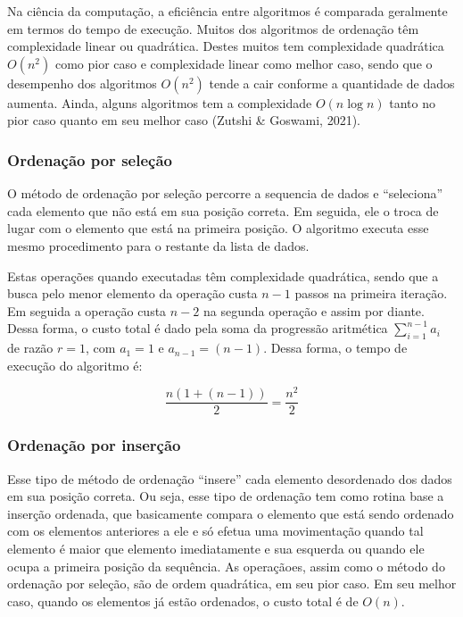 \documentclass[
]{article}
\begin{document}
Na ciência da computação, a eficiência entre algoritmos é comparada
geralmente em termos do tempo de execução. Muitos dos algoritmos de
ordenação têm complexidade linear ou quadrática. Destes muitos tem
complexidade quadrática \(O(n^2)\) como pior caso e complexidade linear
como melhor caso, sendo que o desempenho dos algoritmos \(O(n^2)\) tende
a cair conforme a quantidade de dados aumenta. Ainda, alguns algoritmos
tem a complexidade \(O(n \log n)\) tanto no pior caso quanto em seu
melhor caso (Zutshi \& Goswami, 2021).

\hypertarget{ordenauxe7uxe3o-por-seleuxe7uxe3o}{%
\subsubsection{Ordenação por
seleção}\label{ordenauxe7uxe3o-por-seleuxe7uxe3o}}

O método de ordenação por seleção percorre a sequencia de dados e
``seleciona'' cada elemento que não está em sua posição correta. Em
seguida, ele o troca de lugar com o elemento que está na primeira
posição. O algoritmo executa esse mesmo procedimento para o restante da
lista de dados.

Estas operações quando executadas têm complexidade quadrática, sendo que
a busca pelo menor elemento da operação custa \(n - 1\) passos na
primeira iteração. Em seguida a operação custa \(n - 2\) na segunda
operação e assim por diante. Dessa forma, o custo total é dado pela soma
da progressão aritmética \(\sum\limits_{i = 1}^{n-1} a_i\) de razão
\(r = 1\), com \(a_1 = 1\) e \(a_{n-1} = (n-1)\). Dessa forma, o tempo
de execução do algoritmo é:

\begin{equation}
  \frac{n(1+(n-1))}{2} = \frac{n^2}{2}
\end{equation}

\hypertarget{ordenauxe7uxe3o-por-inseruxe7uxe3o}{%
\subsubsection{Ordenação por
inserção}\label{ordenauxe7uxe3o-por-inseruxe7uxe3o}}

Esse tipo de método de ordenação ``insere'' cada elemento desordenado
dos dados em sua posição correta. Ou seja, esse tipo de ordenação tem
como rotina base a inserção ordenada, que basicamente compara o elemento
que está sendo ordenado com os elementos anteriores a ele e só efetua
uma movimentação quando tal elemento é maior que elemento imediatamente
e sua esquerda ou quando ele ocupa a primeira posição da sequência. As
operaçãoes, assim como o método do ordenação por seleção, são de ordem
quadrática, em seu pior caso. Em seu melhor caso, quando os elementos já
estão ordenados, o custo total é de \(O(n)\).
\end{document}
